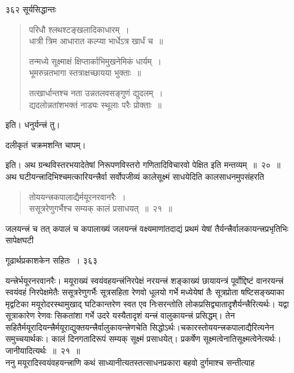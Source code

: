 \documentclass[11pt, openany]{book}
\begin{document}
\newpage


\noindent ३६२ \hspace{4cm} सूर्यसिद्धान्तः
\vspace{1cm}

\begin{quote}
 {\qt परिधौ श्लथश्टङ्खलादिकाधारम्~।\\
धात्री त्रिम आधारात
कल्प्या भार्धेऽत्र खार्धं च~॥

तन्मध्ये सूक्ष्माक्षं
क्षिप्तार्काभिमुखनेमिकं धार्यम्~।\\
भूमरुन्नतभागा
स्तत्राक्षच्छायया भुक्ताः~॥

तत्खार्धान्तश्च नता
उन्नतलवसङ्गुणं द्युदलम्~।\\
द्यदलोन्नतांशभक्तं
नाड्यः स्थूलाः परैः प्रोक्ताः~॥ }
\end{quote}

\noindent इति। धनुर्यन्त्त्रं तु। 

\vspace{2mm}
{\setlength{\parindent}{6em}
  दलीकृतं चक्रमशन्ति चापम्। }
\vspace{2mm}

\noindent इति। अथ ग्रन्थविस्तरभयादेतेषां निरूपणविस्तरो गणितादिविचारवो पेक्षित इति मन्तव्यम्~॥~२०~॥  \\
 \noindent अथ घटीयन्त्त्रादिभिश्चमत्कारियन्त्त्रैर्वा सर्वोपजीव्यं कालेसूक्ष्मं साधयेदिति कालसाधनमुपसंहरति \textendash


 \begin{quote}
{\ssi तोययन्त्त्रकपालाद्यैर्मयूरनरवानरैः~। \\
ससूत्ररेणुगर्भैश्च सम्यक् कालं प्रसाधयत्~॥~२१~॥}
\end{quote}
 जलयन्त्त्रं च तत् कपालं च कपालाख्यं जलयन्त्त्रं वक्ष्यमाणांतदाद्यं प्रथमं येषां तैर्यन्त्त्रैर्वालकायन्त्त्रप्रभृतिभिः सापेक्षघटी 



\newpage


\hspace{3cm} गूढार्थप्रकाशकेन सहितः~।  \hfill ३६३ 
\vspace{1cm}


\noindent यन्त्त्रेर्भयूरनरवानरैः। मयूराख्यं स्वयंवहयन्त्त्रंनिरपेक्षं नरयन्त्त्रं शङ्काख्यं छायायन्त्रं पूर्वोद्दिष्टं वानरयन्त्त्रं स्वयंवहं निरपेक्षमेतैः ससूत्ररेणुगर्भैः सूत्रसहिता रेणवो धूलयो गर्भे मध्येयेषां तैः सूत्रप्रोता षष्टिसङ्ख्याका मृद्वटिका मयूरोदरस्थामुखाद् घटिकान्तरेण स्वत एव निःसरन्तोति लोकप्रसिद्व्यातादृशैर्यन्त्त्रैरित्यर्थः। यद्वा सूत्राकारेण रेणवः सिकतांशा गर्भे उदरे यस्यैतादृशं यन्त्त्रं वालुकायन्त्त्रं प्रसिद्धम्। तेन सहितैर्मयूरादियन्त्त्रैर्मयूराद्युक्तयन्त्त्रैर्वालुकायन्त्त्रेणचेति सिद्धोऽर्थः।चकारस्तोययन्त्त्रकपालाद्यैरित्यनेन समुच्चयार्थकः। कालं दिनगतादिरूपं सम्यक् सूक्ष्मं प्रसाधयेत्। प्रकर्षेण सूक्ष्मत्वेनातिसूक्ष्मत्वेनेत्यर्थः। जानीयादित्यर्थः~॥~२१~॥\\
\noindent ननु मयूरादिस्वयंवहयन्त्त्राणि कथं साध्यानीत्यतस्तत्साधनप्रकारा बहवो दुर्गमाश्च सन्तीत्याह \textendash
\end{document}
